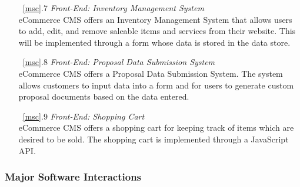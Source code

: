 \documentclass{article}
\newcommand{\br}{\vspace{2mm}}
\begin{document}
\begin{enumerate}
    \item[~\ref{msc}.7 ] \emph{Front-End: Inventory Management System}\br\\
        eCommerce CMS offers an Inventory Management System that allows users to
        add, edit, and remove saleable items and services from their website.  This
        will be implemented through a form whose data is stored in the data
        store.
    \item[~\ref{msc}.8 ] \emph{Front-End: Proposal Data Submission System}\br\\
        eCommerce CMS offers a Proposal Data Submission System.  The system
        allows customers to input data into a form and for users to generate
        custom proposal documents based on the data entered.
    \item[~\ref{msc}.9 ] \emph{Front-End: Shopping Cart}\br\\
        eCommerce CMS offers a shopping cart for keeping track of items which
        are desired to be sold.  The shopping cart is implemented through a
        JavaScript API.
\end{enumerate}


\subsubsection{Major Software Interactions}
\label{msi}
\end{document}
